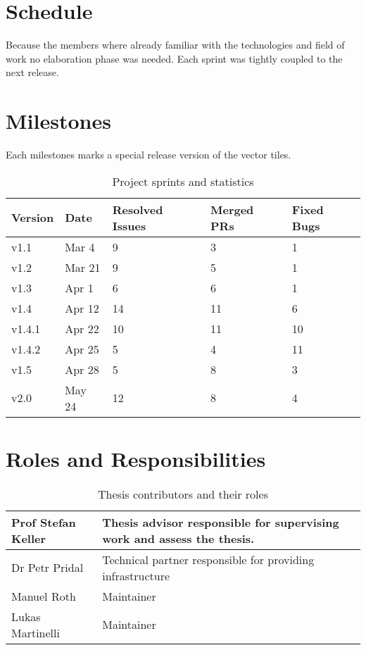 \section{Schedule}

Because the \osmvt{} members where already familiar with the technologies and field of work no elaboration phase was needed. Each sprint was tightly coupled to the next release.

\section{Milestones}

Each milestones marks a special release version of the vector tiles.

\begin{table}[H]
\centering
    \begin{tabular}{p{1.5cm} p{1.5cm} p{1.5cm} p{1.5cm} p{1.5cm}}
    Version & Date  & Resolved Issues & Merged PRs & Fixed Bugs\\
    \hline
    v1.1   & Mar 4  & 9 & 3 & 1 \\
    v1.2   & Mar 21 & 9 & 5 & 1 \\
    v1.3   & Apr 1  & 6 & 6 & 1 \\
    v1.4   & Apr 12 & 14 & 11 & 6 \\
    v1.4.1 & Apr 22 & 10 & 11 & 10 \\
    v1.4.2 & Apr 25 & 5 & 4 & 11 \\
    v1.5   & Apr 28 & 5 & 8 & 3 \\
    v2.0   & May 24 & 12 & 8 & 4 \\
    \end{tabular}
    \caption[Milestones]{Project sprints and statistics}
\end{table}

\section{Roles and Responsibilities}\label{roles-and-responsibilities}

\begin{table}[H]
\centering
    \begin{tabular}{p{3cm} p{9.5cm}}
Prof Stefan Keller & Thesis advisor responsible for supervising work and
assess the thesis.\\ \hline
Dr Petr Pridal &
Technical partner responsible for providing infrastructure \\ \hline
Manuel Roth &
Maintainer\\ \hline
Lukas Martinelli &
Maintainer\\ \hline
    \end{tabular}
    \caption{Thesis contributors and their roles}
\end{table}

